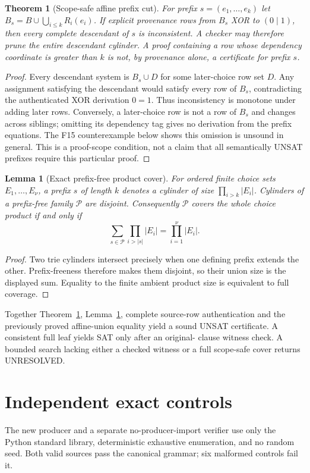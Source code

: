 \documentclass[11pt]{article}
\newtheorem{theorem}{Theorem}
\newtheorem{lemma}{Lemma}
\begin{document}
\begin{theorem}[Scope-safe affine prefix cut]\label{thm:scope}
For prefix $s=(e_1,\ldots,e_k)$ let
$B_s=B\cup\bigcup_{i\le k}R_i(e_i)$. If explicit provenance rows from
$B_s$ XOR to $(0\mid1)$, then every complete descendant of $s$ is
inconsistent. A checker may therefore prune the entire descendant cylinder.
A proof containing a row whose dependency coordinate is greater than $k$ is
not, by provenance alone, a certificate for prefix $s$.
\end{theorem}
\begin{proof}
Every descendant system is $B_s\cup D$ for some later-choice row set $D$.
Any assignment satisfying the descendant would satisfy every row of $B_s$,
contradicting the authenticated XOR derivation $0=1$. Thus inconsistency is
monotone under adding later rows. Conversely, a later-choice row is not a row
of $B_s$ and changes across siblings; omitting its dependency tag gives no
derivation from the prefix equations. The F15 counterexample below shows this
omission is unsound in general. This is a proof-scope condition, not a claim
that all semantically UNSAT prefixes require this particular proof.
\end{proof}

\begin{lemma}[Exact prefix-free product cover]\label{lem:cover}
For ordered finite choice sets $E_1,\ldots,E_\nu$, a prefix $s$ of length
$k$ denotes a cylinder of size $\prod_{i>k}|E_i|$. Cylinders of a prefix-free
family $\mathcal P$ are disjoint. Consequently $\mathcal P$ covers the whole
choice product if and only if
\[
 \sum_{s\in\mathcal P}\prod_{i>|s|}|E_i|
 =\prod_{i=1}^{\nu}|E_i|.
\]
\end{lemma}
\begin{proof}
Two trie cylinders intersect precisely when one defining prefix extends the
other. Prefix-freeness therefore makes them disjoint, so their union size is
the displayed sum. Equality to the finite ambient product size is equivalent
to full coverage.
\end{proof}

Together Theorem~\ref{thm:scope}, Lemma~\ref{lem:cover}, complete source-row
authentication and the previously proved affine-union equality yield a sound
UNSAT certificate. A consistent full leaf yields SAT only after an original-
clause witness check. A bounded search lacking either a checked witness or a
full scope-safe cover returns UNRESOLVED.

\section{Independent exact controls}
The new producer and a separate no-producer-import verifier use only the Python
standard library, deterministic exhaustive enumeration, and no random seed.
Both valid sources pass the canonical grammar; six malformed controls fail it.
\end{document}
